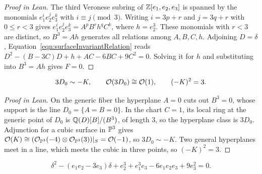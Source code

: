 \begin{proof}[Proof in Lean]

\leanok


The third Veronese subring of $\mathbb{Z}[e_1,e_2,e_3]$ is spanned by the monomials $e_1^ie_2^je_3^k$ with $i\equiv j\pmod 3$. Writing $i=3p+r$ and $j=3q+r$ with $0\le r<3$ gives $e_1^ie_2^je_3^k=A^pB^rh^qC^k$, where $h=e_2^3$. These monomials with $r<3$ are distinct, so $B^3=Ah$ generates all relations among $A,B,C,h$. Adjoining $D=\delta$, Equation~\ref{eqn:surfaceInvariantRelation} reads $D^2-(B-3C)D+h+AC-6BC+9C^2=0$. Solving it for $h$ and substituting into $B^3=Ah$ gives $F=0$.

\end{proof}

\begin{equationnode}

\label{eqn:surfaceAnticanonical}


\leanok



\begin{equation*} 3D_0\sim-K,\qquad \mathcal{O}(3D_0)\cong\mathcal{O}(1),\qquad (-K)^2=3. \end{equation*}

\end{equationnode}

\begin{proof}[Proof in Lean]

\leanok

On the generic fiber the hyperplane $A=0$ cuts out $B^3=0$, whose support is the line $D_0=\{A=B=0\}$. In the chart $C=1$, its local ring at the generic point of $D_0$ is $\mathbb{Q}(D)[B]/(B^3)$, of length $3$, so the hyperplane class is $3D_0$. Adjunction for a cubic surface in $\mathbb{P}^3$ gives $\mathcal{O}(K)\cong(\mathcal{O}_{\mathbb{P}^3}(-4)\otimes\mathcal{O}_{\mathbb{P}^3}(3))|_S=\mathcal{O}(-1)$, so $3D_0\sim-K$. Two general hyperplanes meet in a line, which meets the cubic in three points, so $(-K)^2=3$.

\end{proof}

\begin{equationnode}

\label{eqn:surfaceInvariantRelation}


\leanok



\begin{equation*} \delta^2-(e_1e_2-3e_3)\delta +e_2^3+e_1^3e_3-6e_1e_2e_3+9e_3^2=0. \end{equation*}

\end{equationnode}

